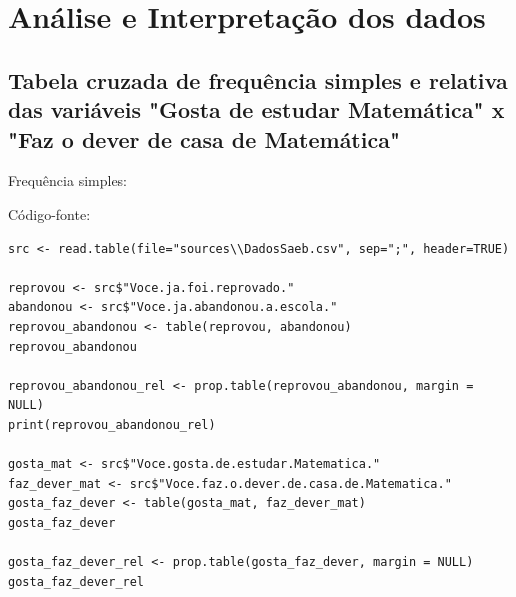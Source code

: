 \documentclass[17pt]{extarticle}
\begin{document}
\newpage
\section{Análise e Interpretação dos dados}
\subsection{Tabela cruzada de frequência simples e relativa das variáveis "Gosta de estudar Matemática" x "Faz o dever de casa de Matemática"}
Frequência simples:
\begin{table}[H]
\end{table}
\begin{table}[H]
\end{table}
Código-fonte:
\begin{lstlisting}
src <- read.table(file="sources\\DadosSaeb.csv", sep=";", header=TRUE)

reprovou <- src$"Voce.ja.foi.reprovado."
abandonou <- src$"Voce.ja.abandonou.a.escola."
reprovou_abandonou <- table(reprovou, abandonou)
reprovou_abandonou

reprovou_abandonou_rel <- prop.table(reprovou_abandonou, margin = NULL)
print(reprovou_abandonou_rel)

gosta_mat <- src$"Voce.gosta.de.estudar.Matematica."
faz_dever_mat <- src$"Voce.faz.o.dever.de.casa.de.Matematica."
gosta_faz_dever <- table(gosta_mat, faz_dever_mat)
gosta_faz_dever

gosta_faz_dever_rel <- prop.table(gosta_faz_dever, margin = NULL)
gosta_faz_dever_rel

\end{lstlisting}
\end{document}
